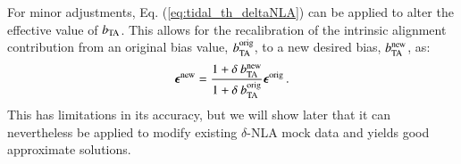 For minor adjustments, Eq. (\ref{eq:tidal_th_deltaNLA}) can be applied to alter the effective value of $b_{\rm TA}$. This allows for the recalibration of the intrinsic alignment contribution from an original bias value, $b_{\rm TA}^{\rm orig}$, to a new desired bias, $b_{\rm TA}^{\rm new}$, as:
\begin{eqnarray}
{\boldsymbol \epsilon}^{\rm new} = \frac{1 + \delta \: b_{\rm TA}^{\rm new}}{1 + \delta \: b_{\rm TA}^{\rm orig}}{\boldsymbol \epsilon}^{\rm orig} \, .
\label{eq:bta_rescale}
\end{eqnarray}
This has limitations in its accuracy, but we will show later that it can nevertheless be applied to modify existing $\delta$-NLA mock data and yields good approximate solutions.  


